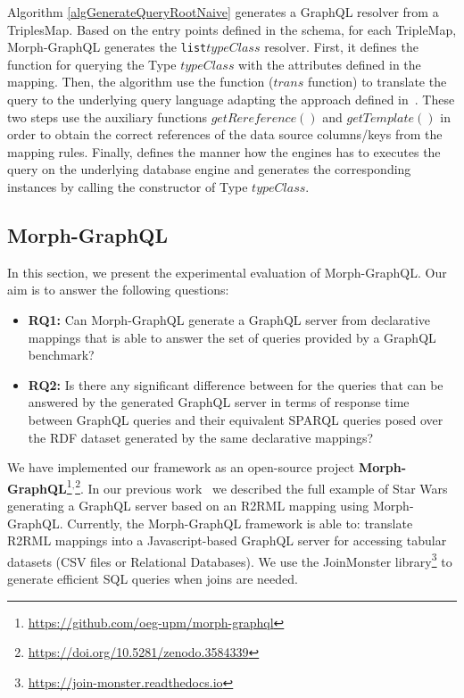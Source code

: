 Algorithm \ref{algGenerateQueryRootNaive} generates a GraphQL resolver from a TriplesMap. Based on the entry points defined in the schema, for each TripleMap, Morph-GraphQL generates the \texttt{list$typeClass$} resolver. First, it defines the function for querying the Type $typeClass$ with the attributes defined in the mapping. Then, the algorithm use the function ($trans$ function) to translate the query to the underlying query language adapting the approach defined in~\citep{chebotko2009semantics}. These two steps use the auxiliary functions $getRereference()$ and $getTemplate()$ in order to obtain the correct references of the data source columns/keys from the mapping rules. Finally, defines the manner how the engines has to executes the query on the underlying database engine and generates the corresponding instances by calling the constructor of Type $typeClass$.




\subsection{Morph-GraphQL}
In this section, we present the experimental evaluation of Morph-GraphQL. Our aim is to answer the following questions:
\begin{itemize}
    \item \textbf{RQ1:} Can Morph-GraphQL generate a GraphQL server from declarative mappings that is able to answer the set of queries provided by a GraphQL benchmark?
    \item \textbf{RQ2:} Is there any significant difference between for the queries that can be answered by the generated GraphQL server in terms of response time between GraphQL queries and their equivalent SPARQL queries posed over the RDF dataset generated by the same declarative mappings?
\end{itemize}

We have implemented our framework as an open-source project \textbf{Morph-GraphQL}\footnote{\url{https://github.com/oeg-upm/morph-graphql}}$^,$\footnote{\url{https://doi.org/10.5281/zenodo.3584339}}. In our previous work~\citep{priyatna2019morph} we described the full example of Star Wars generating a GraphQL server based on an R2RML mapping using Morph-GraphQL. Currently, the Morph-GraphQL framework is able to: translate R2RML mappings into a Javascript-based GraphQL server for accessing tabular datasets (CSV files or Relational Databases)\citep{priyatna2019morph}. We use the JoinMonster library\footnote{\url{https://join-monster.readthedocs.io}} to generate efficient SQL queries when joins are needed.

